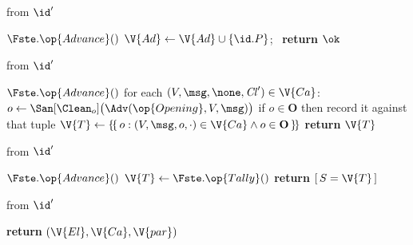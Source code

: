 \begin{interface}
{ \quad from $\id'$
\begin{algorithmic}[1]
\algcont
\State $\Fste.\op{Advance}()$
\State $\V{Ad} \gets \V{Ad} \cup \{\id.P\}$; \ \textbf{return} $\ok$
\algsave
\end{algorithmic}
\vspace{1.4ex}

 \quad from $\id'$
\begin{algorithmic}[1]
\algcont
\State $\Fste.\op{Advance}()$
 \label{ln:voteadvtally}
   \label{ln:voteearlyadv}
\EndIf
{}
\EndIf
{} \label{ln:voteopenings}
  \State for each $(V, \msg, \none, \mathit{Cl}') \in \V{Ca}$: \ $o \gets \San[\Clean_{o}]\bigl(\Adv(\op{Opening}, V, \msg)\bigr)$ \label{ln:voteadvopens}
  \State \quad if $o \in \mathbf{O}$ then record it against that tuple \label{ln:voteoptionset}
  \State $\V{T} \gets \{\!\{\, o : (V, \msg, o, \cdot) \in \V{Ca} \wedge o \in \mathbf{O} \,\}\!\}$ \label{ln:votemultiset}
\EndIf
\State \textbf{return} $\V{T}$
\algsave
\end{algorithmic}
\vspace{1.4ex}

 \quad from $\id'$
\begin{algorithmic}[1]
\algcont
\State $\Fste.\op{Advance}()$
  \State $\V{T} \gets \Fste.\op{Tally}()$ \label{ln:voteselfcall}
\EndIf
\State \textbf{return} $[\, S = \V{T} \,]$ \label{ln:voteverify}
\algsave
\end{algorithmic}
\vspace{1.4ex}

 \quad from $\id'$
\begin{algorithmic}[1]
\algcont
\State \textbf{return} $(\V{El}, \V{Ca}, \V{par})$ \label{ln:voteleak}
\algsave
\end{algorithmic}}
\end{interface}
